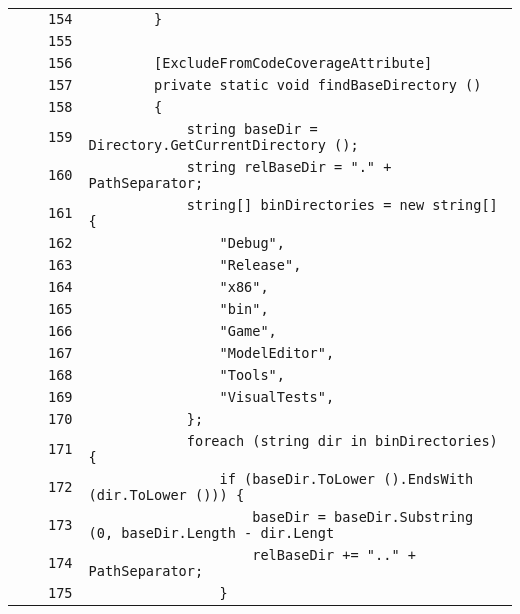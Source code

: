 \documentclass[a4paper,10pt]{article}
\begin{document}
\begin{longtable}[l]{lrrl}
\cellcolor{gray} &  & \verb~154~ & \verb~        }~\\
\cellcolor{gray} &  & \verb~155~ & \verb~~\\
\cellcolor{gray} &  & \verb~156~ & \verb~        [ExcludeFromCodeCoverageAttribute]~\\
\cellcolor{gray} &  & \verb~157~ & \verb~        private static void findBaseDirectory ()~\\
\cellcolor{gray} &  & \verb~158~ & \verb~        {~\\
\cellcolor{gray} &  & \verb~159~ & \verb~            string baseDir = Directory.GetCurrentDirectory ();~\\
\cellcolor{gray} &  & \verb~160~ & \verb~            string relBaseDir = "." + PathSeparator;~\\
\cellcolor{gray} &  & \verb~161~ & \verb~            string[] binDirectories = new string[] {~\\
\cellcolor{gray} &  & \verb~162~ & \verb~                "Debug",~\\
\cellcolor{gray} &  & \verb~163~ & \verb~                "Release",~\\
\cellcolor{gray} &  & \verb~164~ & \verb~                "x86",~\\
\cellcolor{gray} &  & \verb~165~ & \verb~                "bin",~\\
\cellcolor{gray} &  & \verb~166~ & \verb~                "Game",~\\
\cellcolor{gray} &  & \verb~167~ & \verb~                "ModelEditor",~\\
\cellcolor{gray} &  & \verb~168~ & \verb~                "Tools",~\\
\cellcolor{gray} &  & \verb~169~ & \verb~                "VisualTests",~\\
\cellcolor{gray} &  & \verb~170~ & \verb~            };~\\
\cellcolor{gray} &  & \verb~171~ & \verb~            foreach (string dir in binDirectories) {~\\
\cellcolor{gray} &  & \verb~172~ & \verb~                if (baseDir.ToLower ().EndsWith (dir.ToLower ())) {~\\
\cellcolor{gray} &  & \verb~173~ & \verb~                    baseDir = baseDir.Substring (0, baseDir.Length - dir.Lengt~\\
\cellcolor{gray} &  & \verb~174~ & \verb~                    relBaseDir += ".." + PathSeparator;~\\
\cellcolor{gray} &  & \verb~175~ & \verb~                }~\\

\end{longtable}
\end{document}
